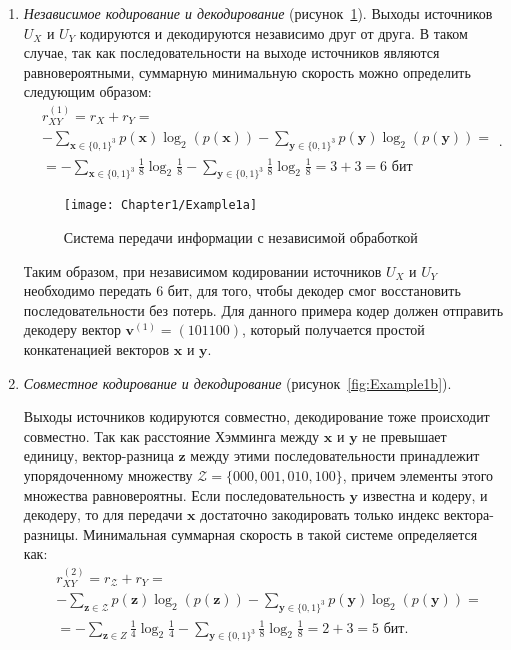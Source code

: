 \begin{enumerate}
\item \emph{Независимое кодирование и декодирование} (рисунок~\ref{fig:Example1a}).
Выходы источников $U_X$ и $U_Y$ кодируются и декодируются независимо друг от друга. В таком случае, так как последовательности на выходе источников являются равновероятными, суммарную минимальную скорость можно определить следующим образом:
\begin{equation*}
\begin{split}
& r_{XY}^{(1)} = r_X + r_Y = \\
& - \sum\limits_{ \mathbf{x} \in \{0,1\}^3} p(\mathbf{x}) \log_2(p(\mathbf{x})) - 
\sum\limits_{ \mathbf{y} \in \{0,1\}^3} p(\mathbf{y}) \log_2(p(\mathbf{y})) = \\
& = - \sum\limits_{ \mathbf{x} \in \{0,1\}^3} \frac{1}{8} \log_2\frac{1}{8} - 
\sum\limits_{ \mathbf{y} \in \{0,1\}^3} \frac{1}{8} \log_2\frac{1}{8} = 3 + 3 = 6 \text{ бит}
\end{split}.
\end{equation*}

\begin{figure}[thbp]
\begin{center}
\texttt{[image: Chapter1/Example1a]}
\caption{Система передачи информации с независимой обработкой}
\label{fig:Example1a}
\end{center}
\end{figure}

Таким образом, при независимом кодировании источников $U_X$ и $U_Y$ необходимо передать 6 бит, для того, чтобы декодер смог восстановить последовательности без потерь. Для данного примера кодер должен отправить декодеру вектор $\mathbf{v}^{(1)}=(101100)$, который получается простой конкатенацией векторов $\mathbf{x}$ и $\mathbf{y}$.

\item \emph{Совместное кодирование и декодирование} (рисунок~\ref{fig:Example1b}).

Выходы источников кодируются совместно, декодирование тоже происходит совместно. Так как расстояние Хэмминга между $\mathbf{x}$ и $\mathbf{y}$ не превышает единицу, вектор-разница $\mathbf{z}$ между этими последовательности принадлежит упорядоченному множеству $\mathcal{Z}=\{000, 001, 010, 100\}$, причем элементы этого множества равновероятны. Если последовательность $\mathbf{y}$ известна и кодеру, и декодеру, то для передачи $\mathbf{x}$ достаточно закодировать только индекс вектора-разницы. Минимальная суммарная скорость в такой системе определяется как:
\begin{equation*}
\begin{split}
& r_{XY}^{(2)} = r_{\mathcal{Z}} + r_Y = \\
& - \sum\limits_{ \mathbf{z} \in \mathcal{Z}} p(\mathbf{z}) \log_2(p(\mathbf{z})) - 
\sum\limits_{ \mathbf{y} \in \{0,1\}^3} p(\mathbf{y}) \log_2(p(\mathbf{y})) = \\
& = - \sum\limits_{ \mathbf{z} \in Z} \frac{1}{4} \log_2\frac{1}{4} - 
\sum\limits_{ \mathbf{y} \in \{0,1\}^3} \frac{1}{8} \log_2\frac{1}{8} = 2 + 3 = 5 \text{ бит}.
\end{split}
\end{equation*}


\end{enumerate}
